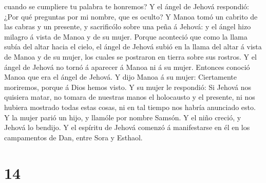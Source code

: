 cuando se cumpliere tu palabra te honremos?  Y el ángel de
Jehová respondió: ¿Por qué preguntas por mi nombre, que es oculto?
 Y Manoa tomó un cabrito de las cabras y un presente, y
sacrificólo sobre una peña á Jehová: y el ángel hizo milagro á vista de
Manoa y de su mujer.  Porque aconteció que como la llama
subía del altar hacia el cielo, el ángel de Jehová subió en la llama del
altar á vista de Manoa y de su mujer, los cuales se postraron en tierra
sobre sus rostros.  Y el ángel de Jehová no tornó á
aparecer á Manoa ni á su mujer. Entonces conoció Manoa que era el ángel
de Jehová.  Y dijo Manoa á su mujer: Ciertamente moriremos,
porque á Dios hemos visto.  Y su mujer le respondió: Si
Jehová nos quisiera matar, no tomara de nuestras manos el holocausto y
el presente, ni nos hubiera mostrado todas estas cosas, ni en tal tiempo
nos habría anunciado esto.  Y la mujer parió un hijo, y
llamóle por nombre Samsón. Y el niño creció, y Jehová lo bendijo.
 Y el espíritu de Jehová comenzó á manifestarse en él en
los campamentos de Dan, entre Sora y Esthaol.

\hypertarget{section-13}{%
\section{14}\label{section-13}}


